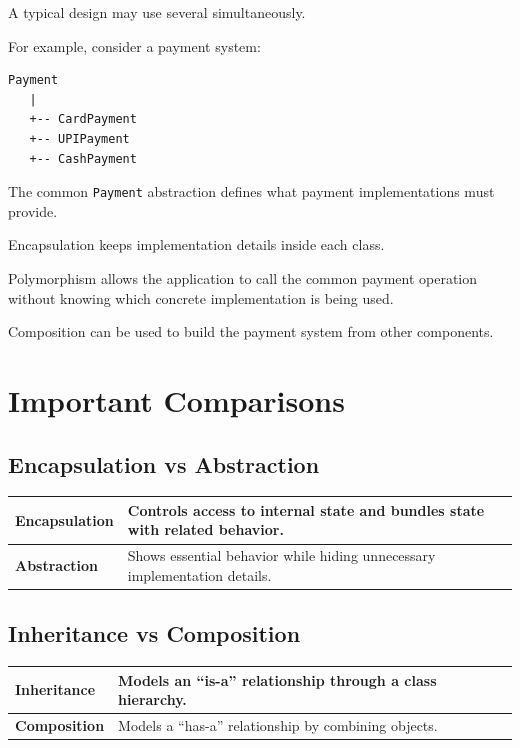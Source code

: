 \documentclass[11pt,a4paper]{article}
\begin{document}
A typical design may use several simultaneously.

For example, consider a payment system:

\begin{verbatim}
Payment
   |
   +-- CardPayment
   +-- UPIPayment
   +-- CashPayment
\end{verbatim}

The common \texttt{Payment} abstraction defines what payment implementations
must provide.

Encapsulation keeps implementation details inside each class.

Polymorphism allows the application to call the common payment operation
without knowing which concrete implementation is being used.

Composition can be used to build the payment system from other components.

\section{Important Comparisons}

\subsection{Encapsulation vs Abstraction}

\begin{tabularx}{\textwidth}{|p{}|X|}
\hline
\textbf{Encapsulation} & Controls access to internal state and bundles state with related behavior.\\
\hline
\textbf{Abstraction} & Shows essential behavior while hiding unnecessary implementation details.\\
\hline
\end{tabularx}

\subsection{Inheritance vs Composition}

\begin{tabularx}{\textwidth}{|p{}|X|}
\hline
\textbf{Inheritance} & Models an ``is-a'' relationship through a class hierarchy.\\
\hline
\textbf{Composition} & Models a ``has-a'' relationship by combining objects.\\
\hline
\end{tabularx}
\end{document}
